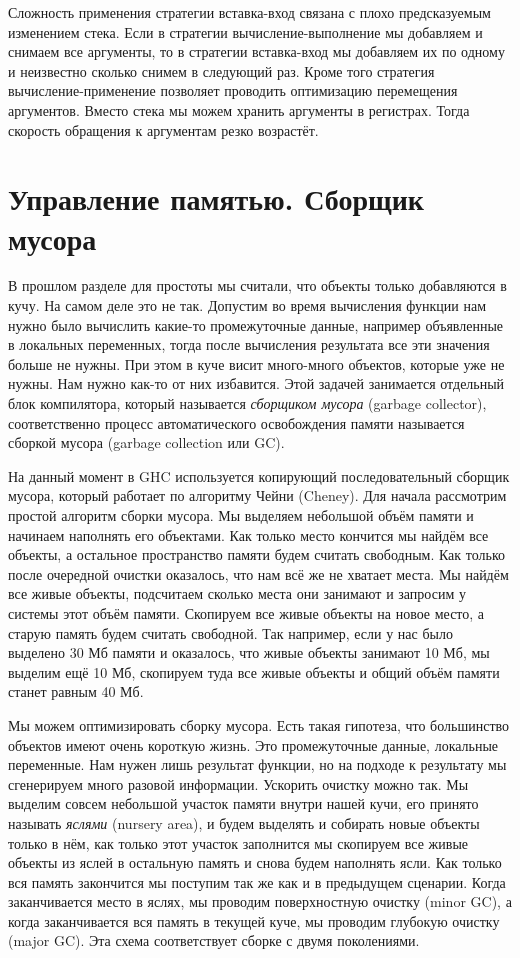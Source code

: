 Сложность применения стратегии вставка-вход связана
с плохо предсказуемым изменением стека. Если в стратегии вычисление-выполнение
мы добавляем и снимаем все аргументы, то в стратегии вставка-вход
мы добавляем их по одному и неизвестно сколько снимем в следующий раз.
Кроме того стратегия вычисление-применение позволяет проводить
оптимизацию перемещения аргументов. Вместо стека мы можем хранить
аргументы в регистрах. Тогда скорость обращения к аргументам
резко возрастёт. 

\section{Управление памятью. Сборщик мусора}

В прошлом разделе для простоты мы считали, что объекты только добавляются
в кучу. На самом деле это не так. Допустим во время вычисления функции
нам нужно было вычислить какие-то промежуточные данные, например
объявленные в локальных переменных, тогда после вычисления результата
все эти значения больше не нужны. При этом в куче висит
много-много объектов, которые уже не нужны. Нам нужно 
как-то от них избавится. Этой задачей занимается отдельный 
блок компилятора, который называется \emph{сборщиком мусора} 
(garbage collector), соответственно процесс автоматического
освобождения памяти называется сборкой мусора (garbage collection или GC).

На данный момент в GHC используется копирующий последовательный
сборщик мусора, который работает по алгоритму Чейни (Cheney). 
Для начала рассмотрим простой алгоритм сборки мусора.
Мы выделяем небольшой объём памяти и начинаем наполнять
его объектами. Как только место кончится мы 
найдём все  объекты, а остальное
пространство памяти будем считать свободным. 
Как только после очередной очистки оказалось, что 
нам всё же не хватает места. Мы найдём все живые 
объекты, подсчитаем сколько места они занимают и
запросим у системы этот объём памяти. Скопируем все
живые объекты на новое место, а старую память будем 
считать свободной. 
Так например, если у нас было выделено 30 Мб памяти и оказалось,
что живые объекты занимают 10 Мб, мы выделим ещё 10 Мб, скопируем
туда все живые объекты и общий объём памяти станет равным 40 Мб.

Мы можем оптимизировать сборку мусора. Есть такая гипотеза,
что большинство объектов имеют очень короткую жизнь.
Это промежуточные данные, локальные переменные. 
Нам нужен лишь результат функции, но на подходе к 
результату мы сгенерируем много разовой информации.
Ускорить очистку можно так. Мы выделим совсем небольшой
участок памяти внутри нашей кучи, его принято
называть \emph{яслями} (nursery area), и будем выделять и собирать
новые объекты только в нём, как только этот участок 
заполнится мы скопируем все живые объекты из яслей
в остальную память и снова будем наполнять ясли. 
Как только вся память закончится мы поступим
так же как и в предыдущем сценарии. 
Когда заканчивается место в яслях, мы проводим 
поверхностную очистку (minor GC), а когда заканчивается
вся память в текущей куче, мы проводим глубокую очистку
(major GC). Эта схема соответствует сборке с двумя
поколениями. 

